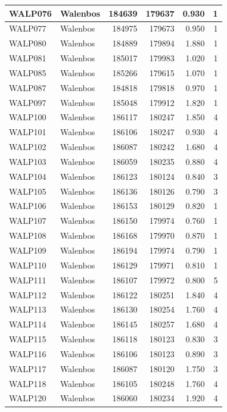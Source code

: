 \documentclass[11pt,]{book}
\begin{document}
\begin{table}
\begin{tabular}[t]{l|l|r|r|r|r}
\hline
WALP076 & Walenbos & 184639 & 179637 & 0.930 & 1\\
\hline
WALP077 & Walenbos & 184975 & 179673 & 0.950 & 1\\
\hline
WALP080 & Walenbos & 184889 & 179894 & 1.880 & 1\\
\hline
WALP081 & Walenbos & 185017 & 179983 & 1.020 & 1\\
\hline
WALP085 & Walenbos & 185266 & 179615 & 1.070 & 1\\
\hline
WALP087 & Walenbos & 184818 & 179818 & 0.970 & 1\\
\hline
WALP097 & Walenbos & 185048 & 179912 & 1.820 & 1\\
\hline
WALP100 & Walenbos & 186117 & 180247 & 1.850 & 4\\
\hline
WALP101 & Walenbos & 186106 & 180247 & 0.930 & 4\\
\hline
WALP102 & Walenbos & 186087 & 180242 & 1.680 & 4\\
\hline
WALP103 & Walenbos & 186059 & 180235 & 0.880 & 4\\
\hline
WALP104 & Walenbos & 186123 & 180124 & 0.840 & 3\\
\hline
WALP105 & Walenbos & 186136 & 180126 & 0.790 & 3\\
\hline
WALP106 & Walenbos & 186153 & 180129 & 0.820 & 1\\
\hline
WALP107 & Walenbos & 186150 & 179974 & 0.760 & 1\\
\hline
WALP108 & Walenbos & 186168 & 179970 & 0.870 & 1\\
\hline
WALP109 & Walenbos & 186194 & 179974 & 0.790 & 1\\
\hline
WALP110 & Walenbos & 186129 & 179971 & 0.810 & 1\\
\hline
WALP111 & Walenbos & 186107 & 179972 & 0.800 & 5\\
\hline
WALP112 & Walenbos & 186122 & 180251 & 1.840 & 4\\
\hline
WALP113 & Walenbos & 186130 & 180254 & 1.760 & 4\\
\hline
WALP114 & Walenbos & 186145 & 180257 & 1.680 & 4\\
\hline
WALP115 & Walenbos & 186118 & 180123 & 0.830 & 3\\
\hline
WALP116 & Walenbos & 186106 & 180123 & 0.890 & 3\\
\hline
WALP117 & Walenbos & 186087 & 180120 & 1.750 & 3\\
\hline
WALP118 & Walenbos & 186105 & 180248 & 1.760 & 4\\
\hline
WALP120 & Walenbos & 186060 & 180234 & 1.920 & 4\\

\end{tabular}
\end{table}
\end{document}
